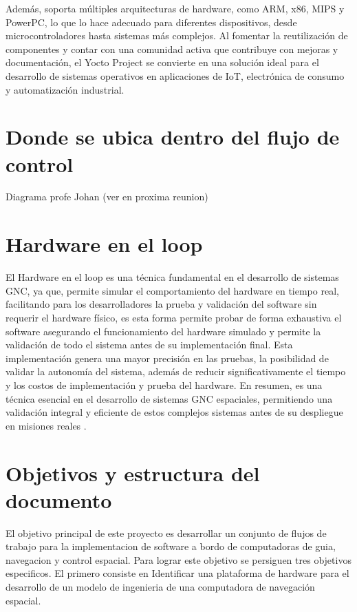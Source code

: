Además, soporta múltiples arquitecturas de hardware, como ARM, x86, MIPS y PowerPC, lo que lo hace adecuado para diferentes 
dispositivos, desde microcontroladores hasta sistemas más complejos. Al fomentar la reutilización de componentes y contar con 
una comunidad activa que contribuye con mejoras y documentación, el Yocto Project se convierte en una solución ideal para el 
desarrollo de sistemas operativos en aplicaciones de IoT, electrónica de consumo y automatización industrial. \cite{vaduva2015learning}

\section{Donde se ubica dentro del flujo de control}
Diagrama profe Johan (ver en proxima reunion)

\section{Hardware en el loop}
El Hardware en el loop es una técnica fundamental en el desarrollo de sistemas GNC, ya que, permite 
simular el comportamiento del hardware en tiempo real, facilitando para los desarrolladores la 
prueba y validación del software sin requerir el hardware físico, es esta forma permite probar 
de forma exhaustiva el software asegurando el funcionamiento del hardware simulado y permite la 
validación de todo el sistema antes de su implementación final. Esta implementación genera una 
mayor precisión en las pruebas, la posibilidad de validar la autonomía del sistema, además de 
reducir significativamente el tiempo y los costos de implementación y prueba del hardware. En 
resumen, es una técnica esencial en el desarrollo de sistemas GNC espaciales, permitiendo una 
validación integral y eficiente de estos complejos sistemas antes de su despliegue en misiones 
reales \cite{mihalivc2022hardware} \cite{montoya2020advanced}.




\section{Objetivos y estructura del documento}


El objetivo principal de este proyecto es desarrollar un conjunto de flujos de trabajo para la implementacion de software a bordo de
computadoras de guia, navegacion y control espacial. Para lograr este objetivo se persiguen tres objetivos
especificos. El primero consiste en Identificar una plataforma de hardware para el desarrollo de un modelo de ingenieria de
una computadora de navegación espacial.

